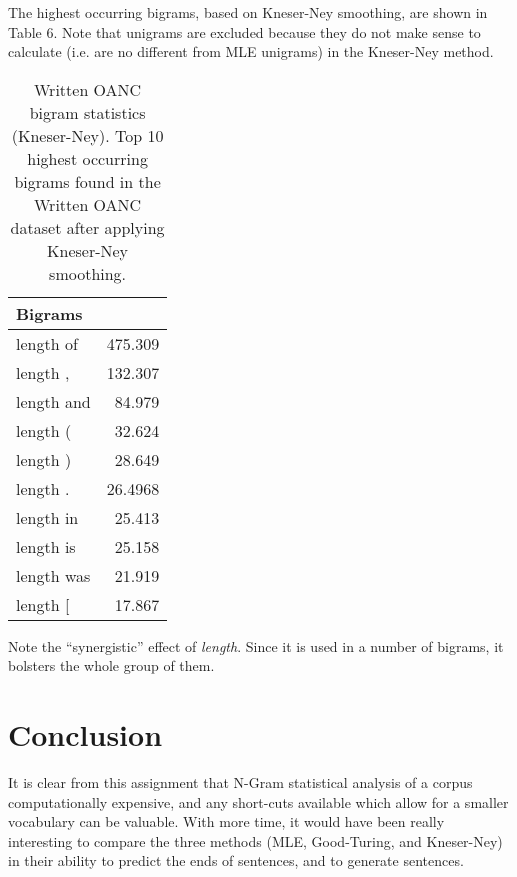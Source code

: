 \documentclass[11pt]{article}
\begin{document}
The highest occurring bigrams, based on Kneser-Ney smoothing, are shown in Table 6. Note
that unigrams are excluded because they do not make sense to calculate (i.e. are no different
from MLE unigrams) in the Kneser-Ney method.

\begin{table}[h]
\begin{center}
\begin{tabular}{|lr|}
\hline \bf Bigrams & \\ \hline
length of & 475.309  \\
length , & 132.307  \\
length and & 84.979  \\
length ( & 32.624  \\
length ) & 28.649   \\
length . & 26.4968  \\
length in & 25.413 \\
length is & 25.158 \\
length was & 21.919 \\
length [ & 17.867  \\
\hline
\end{tabular}
\end{center}
\caption{\label{tokenStats} Written OANC bigram statistics (Kneser-Ney).
Top 10 highest occurring bigrams found in the Written OANC dataset after
applying Kneser-Ney smoothing.}
\end{table}

Note the ``synergistic'' effect of {\em length}. Since it is used in a number
of bigrams, it bolsters the whole group of them.

\section{Conclusion}
It is clear from this assignment that N-Gram statistical analysis of a corpus
computationally expensive, and any short-cuts available which allow for a
smaller vocabulary can be valuable. With more time, it would have been really
interesting to compare the three methods (MLE, Good-Turing, and Kneser-Ney) in
their ability to predict the ends of sentences, and to generate sentences.
\end{document}
